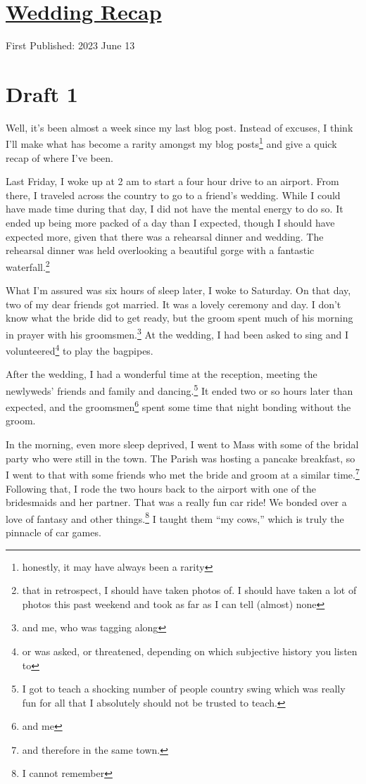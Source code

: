 \documentclass[12pt]{article}[titlepage]
\newcommand{\say}[1]{``#1''}
\newcommand{\1}{\={a}}
\newcommand{\2}{\={e}}
\newcommand{\3}{\={\i}}
\newcommand{\4}{\=o}
\newcommand{\5}{\=u}
\newcommand{\6}{\={A}}
\renewcommand{\,}{\textsuperscript{,}}
\begin{document}
\doublespacing
\section{\href{wedding.html}{Wedding Recap}}
First Published: 2023 June 13
\section{Draft 1}
Well, it's been almost a week since my last blog post.
Instead of excuses, I think I'll make what has become a rarity amongst my blog posts\footnote{honestly, it may have always been a rarity} and give a quick recap of where I've been.

Last Friday, I woke up at 2 am to start a four hour drive to an airport.
From there, I traveled across the country to go to a friend's wedding.
While I could have made time during that day, I did not have the mental energy to do so.
It ended up being more packed of a day than I expected, though I should have expected more, given that there was a rehearsal dinner and wedding.
The rehearsal dinner was held overlooking a beautiful gorge with a fantastic waterfall.\footnote{that in retrospect, I should have taken photos of. I should have taken a lot of photos this past weekend and took as far as I can tell (almost) none}

What I'm assured was six hours of sleep later, I woke to Saturday.
On that day, two of my dear friends got married.
It was a lovely ceremony and day.
I don't know what the bride did to get ready, but the groom spent much of his morning in prayer with his groomsmen.\footnote{and me, who was tagging along}
At the wedding, I had been asked to sing and I volunteered\footnote{or was asked, or threatened, depending on which subjective history you listen to} to play the bagpipes.

After the wedding, I had a wonderful time at the reception, meeting the newlyweds' friends and family and dancing.\footnote{I got to teach a shocking number of people country swing which was really fun for all that I absolutely should not be trusted to teach.}
It ended two or so hours later than expected, and the groomsmen\footnote{and me} spent some time that night bonding without the groom.

In the morning, even more sleep deprived, I went to Mass with some of the bridal party who were still in the town.
The Parish was hosting a pancake breakfast, so I went to that with some friends who met the bride and groom at a similar time.\footnote{and therefore in the same town.}
Following that, I rode the two hours back to the airport with one of the bridesmaids and her partner.
That was a really fun car ride!
We bonded over a love of fantasy and other things.\footnote{I cannot remember}
I taught them \say{my cows,} which is truly the pinnacle of car games.
\end{document}
